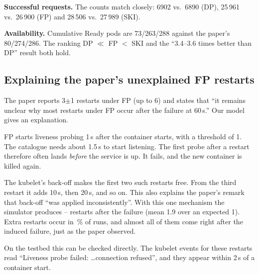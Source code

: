 \documentclass[conference]{IEEEtran}
\begin{document}
\textbf{Successful requests.} The counts match closely: 6902 vs.\ 6890
(DP), 25\,961 vs.\ 26\,900 (FP) and 28\,506 vs.\ 27\,989 (SKI).

\textbf{Availability.} Cumulative Ready pods are 73/263/288 against the
paper's 80/274/286. The ranking DP $\ll$ FP $<$ SKI and the ``3.4--3.6
times better than DP'' result both hold.

\subsection{Explaining the paper's unexplained FP restarts}
\label{sec:fpexplain}
The paper reports 3$\pm$1 restarts under FP (up to 6) and states that
``it remains unclear why most restarts under FP occur after the failure
at 60\,s.'' Our model gives an explanation.

FP starts liveness probing 1\,s after the container starts, with a
threshold of 1. The catalogue needs about 1.5\,s to start listening. The
first probe after a restart therefore often lands \emph{before} the
service is up. It fails, and the new container is killed again.

The kubelet's back-off makes the first two such restarts free. From the
third restart it adds 10\,s, then 20\,s, and so on. This also explains
the paper's remark that back-off ``was applied inconsistently''. With
this one mechanism the simulator produces \simFPrestartsMin--\simFPrestartsMax{}
restarts after the failure (mean 1.9 over an expected 1). Extra restarts
occur in \simFPextraShare\,\% of runs, and almost all of them come right
after the induced failure, just as the paper observed.

On the testbed this can be checked directly. The kubelet events for
these restarts read ``Liveness probe failed: \ldots connection
refused'', and they appear within 2\,s of a container start.
\end{document}
